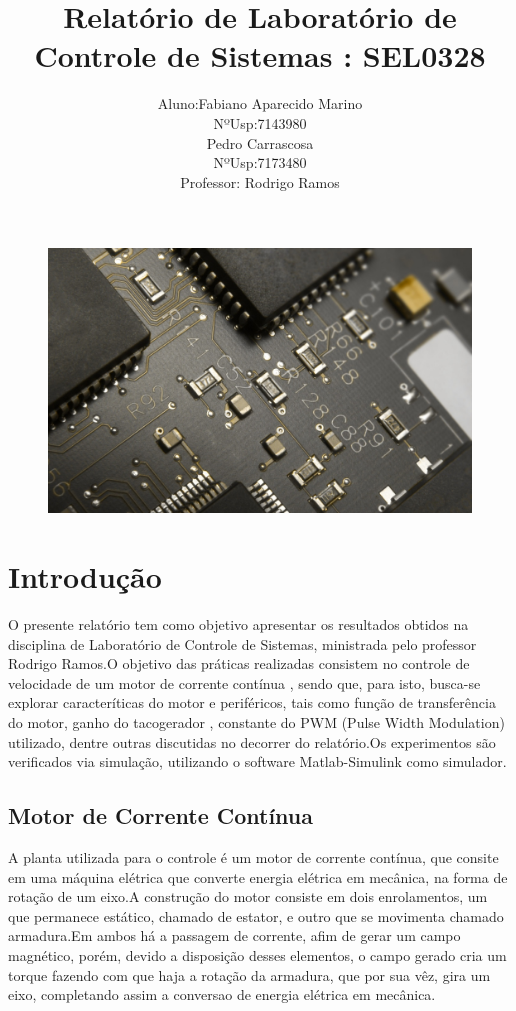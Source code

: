 \documentclass[11pt, a4paper, oneside]{article}
\title{Relatório de Laboratório de Controle de Sistemas : SEL0328}
\author{Aluno:Fabiano Aparecido Marino \\NºUsp:7143980	\\Pedro Carrascosa \\NºUsp:7173480\\ Professor: Rodrigo Ramos}
\begin{document}
\maketitle

\begin{figure}[h!]
\centering
\includegraphics[width=1\linewidth]{capa.jpg}
\end{figure}


\pagebreak

\tableofcontents
\listoffigures

\pagebreak

\section{Introdução}
O presente relatório tem como objetivo apresentar os resultados obtidos na disciplina de Laboratório de Controle de Sistemas, ministrada pelo professor Rodrigo Ramos.O objetivo das práticas realizadas consistem no controle de velocidade de um motor de corrente contínua , sendo que, para isto, busca-se explorar caracteríticas do motor e periféricos, tais como função de transferência do motor, ganho do tacogerador , constante do PWM (Pulse Width Modulation) utilizado, dentre outras discutidas no decorrer do relatório.Os experimentos são verificados via simulação, utilizando o software Matlab-Simulink como simulador.

\subsection{Motor de Corrente Contínua}
A planta utilizada para o controle é um motor de corrente contínua, que consite em uma máquina elétrica que converte energia elétrica em mecânica, na forma de rotação de um eixo.A construção do motor consiste em dois enrolamentos, um que permanece estático, chamado de estator, e outro que se movimenta chamado armadura.Em ambos há a passagem de corrente, afim de gerar um campo magnético, porém, devido a disposição desses elementos, o campo gerado cria um torque fazendo com que haja a rotação da armadura, que por sua vêz, gira um eixo, completando assim a conversao de energia elétrica em mecânica.
\end{document}
